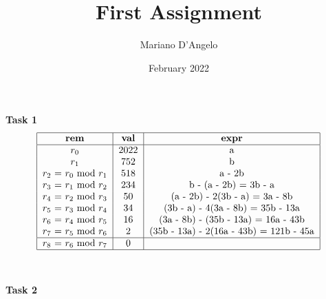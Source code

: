 \documentclass[12pt, letterpaper, twoside]
{article}
\title{First Assignment}
\author{Mariano D'Angelo}
\date{February 2022}
\begin{document}
\maketitle

\textbf{Task 1}
\begin{equation}
\begin{tabular}{ | c | c | c | } \hline
    \textbf{rem} & \textbf{val} & \textbf{expr} \\ \hline
    $r_0$ & 2022 & a \\
    $r_1$ & 752 & b \\
    $r_2$ = $r_0$ mod $r_1$ & 518 & a - 2b \\
    $r_3$ = $r_1$ mod $r_2$ & 234 & b - (a - 2b) = 3b - a \\
    $r_4$ = $r_2$ mod $r_3$ & 50 & (a - 2b) - 2(3b - a) = 3a - 8b \\
    $r_5$ = $r_3$ mod $r_4$ & 34 & (3b - a) - 4(3a - 8b) = 35b - 13a \\
    $r_6$ = $r_4$ mod $r_5$ & 16 & (3a - 8b) - (35b - 13a) = 16a - 43b \\
    $r_7$ = $r_5$ mod $r_6$ & 2 & (35b - 13a) - 2(16a - 43b) = 121b - 45a \\ \hline
    $r_8$ = $r_6$ mod $r_7$ & 0 & \\ \hline
\end{tabular}
\end{equation}
\\ \\
\textbf{Task 2}
\end{document}

